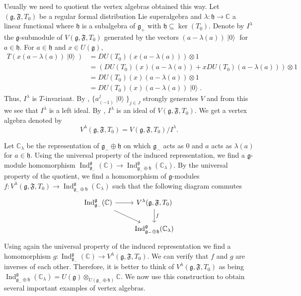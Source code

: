 \documentclass[a4paper, 12pt, reqno]{amsart}
\theoremstyle{remark}
\numberwithin{equation}{subsection}
\DeclareMathOperator{\Ind}{Ind}
\DeclareMathOperator{\vac}{|0\rangle}
\begin{document}
Usually we need to quotient the vertex algebras obtained this way.
Let $(\mathfrak{g}, \mathfrak{F}, T_0)$ be a regular formal distribution Lie superalgebra and $\lambda: \mathfrak{h} \to \mathbb{C}$ a linear functional where $\mathfrak{h}$ is a subalgebra of $\mathfrak{g}_+$ with $\mathfrak{h} \subseteq \ker(T_0)$.
Denote by $I^{\lambda}$ the $\mathfrak{g}$-submodule of $V(\mathfrak{g}, \mathfrak{F}, T_0)$ generated by the vectors $(a - \lambda(a))\vac$ for $a \in \mathfrak{h}$.
For $a \in \mathfrak{h}$ and $x \in U(\mathfrak{g})$,
\begin{align*}
  T(x(a - \lambda(a))\vac) &= DU(T_0)(x(a - \lambda(a)))\otimes1 \\
  &= (DU(T_0)(x)(a - \lambda(a)) + xDU(T_0)(a - \lambda(a)))\otimes1 \\
  &= DU(T_0)(x)(a - \lambda(a))\otimes1 \\
  &= DU(T_0)(x)(a - \lambda(a))\vac.
\end{align*}
Thus, $I^{\lambda}$ is $T$-invariant.
By , $\{a^j_{(-1)}\vac \}_{j \in J}$ strongly generates $V$ and from this we see that $I^{\lambda}$ is a left ideal.
By , $I^{\lambda}$ is an ideal of $V(\mathfrak{g}, \mathfrak{F}, T_0)$.
We get a vertex algebra denoted by
\begin{equation*}
  V^{\lambda}(\mathfrak{g}, \mathfrak{F}, T_0) = V(\mathfrak{g}, \mathfrak{F}, T_0)/I^{\lambda}.
\end{equation*}

Let $\mathbb{C}_{\lambda}$ be the representation of $\mathfrak{g}_- \oplus \mathfrak{h}$ on which $\mathfrak{g}_-$ acts as $0$ and $a$ acts as $\lambda(a)$ for $a \in \mathfrak{h}$.
Using the universal property of the induced representation, we find a $\mathfrak{g}$-module homomorphism $\Ind^{\mathfrak{g}}_{\mathfrak{g}_-}(\mathbb{C}) \to \Ind^{\mathfrak{g}}_{\mathfrak{g}_- \oplus \mathfrak{h}}(\mathbb{C}_{\lambda})$.
By the universal property of the quotient, we find a homomorphism of $\mathfrak{g}$-modules $f: V^{\lambda}(\mathfrak{g}, \mathfrak{F}, T_0) \to \Ind^{\mathfrak{g}}_{\mathfrak{g}_- \oplus \mathfrak{h}}(\mathbb{C}_{\lambda})$ such that the following diagram commutes
\begin{equation*}
  \begin{tikzcd}
    {\Ind^{\mathfrak{g}}_{\mathfrak{g}_-}(\mathbb{C})} \arrow[rd] \arrow[r] & {V^\lambda(\mathfrak{g}, \mathfrak{F}, T_0)} \arrow[d, "f"] \\
    & \Ind^{\mathfrak{g}}_{\mathfrak{g}_- \oplus \mathfrak{h}}(\mathbb{C}_{\lambda})
  \end{tikzcd}
\end{equation*}
Using again the universal property of the induced representation we find a homomorphism $g: \Ind^{\mathfrak{g}}_{\mathfrak{g}_-}(\mathbb{C}) \to V^{\lambda}(\mathfrak{g}, \mathfrak{F}, T_0)$.
We can verify that $f$ and $g$ are inverses of each other.
Therefore, it is better to think of $V^{\lambda}(\mathfrak{g}, \mathfrak{F}, T_0)$ as being $\Ind^{\mathfrak{g}}_{\mathfrak{g}_- \oplus \mathfrak{h}}(\mathbb{C}_{\lambda}) = U(\mathfrak{g})\otimes_{U(\mathfrak{g}_- \oplus \mathfrak{h})}\mathbb{C}$.
We now use this construction to obtain several important examples of vertex algebras.
\end{document}
